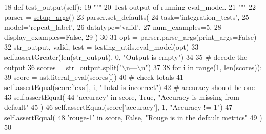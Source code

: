 \begin{DoxyCode}
18     \textcolor{keyword}{def }test\_output(self):
19         \textcolor{stringliteral}{"""}
20 \textcolor{stringliteral}{        Test output of running eval\_model.}
21 \textcolor{stringliteral}{        """}
22         parser = \hyperlink{namespaceparlai_1_1chat__service_1_1services_1_1messenger_1_1run_a17bafea2534d593de1fbf1e0724e5b67}{setup\_args}()
23         parser.set\_defaults(
24             task=\textcolor{stringliteral}{'integration\_tests'},
25             model=\textcolor{stringliteral}{'repeat\_label'},
26             datatype=\textcolor{stringliteral}{'valid'},
27             num\_examples=5,
28             display\_examples=\textcolor{keyword}{False},
29         )
30 
31         opt = parser.parse\_args(print\_args=\textcolor{keyword}{False})
32         str\_output, valid, test = testing\_utils.eval\_model(opt)
33         self.assertGreater(len(str\_output), 0, \textcolor{stringliteral}{"Output is empty"})
34 
35         \textcolor{comment}{# decode the output}
36         scores = str\_output.split(\textcolor{stringliteral}{"\(\backslash\)n---\(\backslash\)n"})
37 
38         \textcolor{keywordflow}{for} i \textcolor{keywordflow}{in} range(1, len(scores)):
39             score = ast.literal\_eval(scores[i])
40             \textcolor{comment}{# check totals}
41             self.assertEqual(score[\textcolor{stringliteral}{'exs'}], i, \textcolor{stringliteral}{"Total is incorrect"})
42             \textcolor{comment}{# accuracy should be one}
43             self.assertEqual(
44                 \textcolor{stringliteral}{'accuracy'} \textcolor{keywordflow}{in} score, \textcolor{keyword}{True}, \textcolor{stringliteral}{"Accuracy is missing from default"}
45             )
46             self.assertEqual(score[\textcolor{stringliteral}{'accuracy'}], 1, \textcolor{stringliteral}{"Accuracy != 1"})
47             self.assertEqual(
48                 \textcolor{stringliteral}{'rouge-1'} \textcolor{keywordflow}{in} score, \textcolor{keyword}{False}, \textcolor{stringliteral}{"Rouge is in the default metrics"}
49             )
50 
\end{DoxyCode}
\mbox{\label{classtests_1_1test__eval__model_1_1TestEvalModel_a6f8c8d67ca1f6a036122e191fdc77c26}} 
